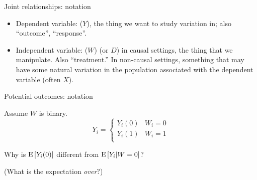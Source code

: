 \documentclass[xcolor={dvipsnames},handout]{beamer}
\begin{document}

\begin{frame}{Joint relationships: notation}

\begin{itemize}
\item Dependent variable: ($Y$), the thing we want to study variation in; also ``outcome'', ``response''.
\item Independent variable: ($W$) (or $D$) in causal settings, the thing that we manipulate. Also ``treatment.'' In non-causal settings, something that may have some natural variation in the population associated with the dependent variable (often $X$).
\end{itemize}


\end{frame}



\begin{frame}{Potential outcomes: notation}

Assume $W$ is binary.
$$
Y_i = \begin{cases}
Y_i(0) & W_i = 0 \\
Y_i(1) & W_i = 1 \\
\end{cases}
$$


Why is ${\textrm E}\,[Y_i(0)]$ different from ${\textrm E}\,[Y_i|W = 0]$?

(What is the expectation \textit{over}?)

\end{frame}


\end{document}
